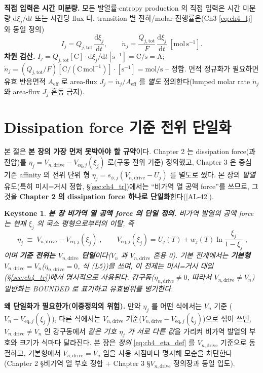 \documentclass[11pt,a4paper]{article}
\newtheorem*{keybox}{Keystone}
\newcommand{\dd}{\mathrm{d}}
\newcommand{\eff}{\mathrm{eff}}
\newcommand{\eq}{\mathrm{eq}}
\newcommand{\drive}{\mathrm{drive}}
\newcommand{\tot}{\mathrm{tot}}
\newcommand{\AL}[1]{\textsf{[AL-#1]}}
\begin{document}
\textbf{직접 입력은 시간 미분량.} 모든 발열률$\cdot$entropy production 의 직접 입력은 시간 미분량 $\dd\xi_j/\dd t$
또는 시간당 flux 다. transition 별 전하/molar 진행률은(Ch3 \eqref{eq:ch4_Ij} 와 동일 정의)
\begin{equation}
I_j=Q_{j,\tot}\,\frac{\dd\xi_j}{\dd t},\qquad
\dot n_j=\frac{Q_{j,\tot}}{F}\,\frac{\dd\xi_j}{\dd t}\ [\mathrm{mol\,s^{-1}}].
\label{eq:ch4_Ij}
\end{equation}
\textbf{차원 검산.} $I_j=Q_{j,\tot}[\mathrm C]\cdot\dd\xi_j/\dd t[\mathrm{s^{-1}}]=\mathrm{C/s}=\mathrm A$;
$\dot n_j=(Q_{j,\tot}/F)[\mathrm{C}/(\mathrm{C\,mol^{-1}})]\cdot[\mathrm{s^{-1}}]=\mathrm{mol/s}$ -- 정합. 면적
정규화가 필요하면 유효 반응면적 $A_{\eff}$ 로 area-flux $J_j=\dot n_j/A_{\eff}$ 를 \emph{별도} 정의한다(lumped
molar rate $\dot n_j$ 와 area-flux $J_j$ 혼동 금지).

\section{Dissipation force 기준 전위 단일화}\label{sec:ch4_eta_single}
본 절은 \textbf{본 장의 가장 먼저 못박아야 할 규약}이다. Chapter 2 는 dissipation force(과전압)를
$\eta_j=V_{n,\drive}-V_{\eq,j}(\xi_j)$ 로(구동 전위 기준) 정의했고, Chapter 3 은 중심 기준 affinity 의
전위 단위 형 $\eta_j=s_{\phi,j}(V_{n,\drive}-U_j)$ 를 별도로 썼다. 본 장의 \emph{발열} 유도(특히 미시=거시
정합, \S\ref{sec:ch4_tr})에서는 ``비가역 열 공액 force''를 쓰므로, 그것을 \textbf{Chapter 2 의 dissipation
force 하나로 단일화}한다(\AL{42}).
\begin{keybox}
\textbf{본 장 비가역 열 공액 force 의 단일 정의.} 비가역 발열의 공액 force 는 \emph{현재}
$\xi_j$ 의 국소 평형으로부터의 이탈, 즉
\begin{equation}
\boxed{\;\eta_j\;\equiv\;V_{n,\drive}-V_{\eq,j}(\xi_j)\;,\qquad V_{\eq,j}(\xi_j)=U_j(T)+w_j(T)\ln\frac{\xi_j}{1-\xi_j}\;,}
\label{eq:ch4_eta_def}
\end{equation}
이며 \textbf{기준 전위는 $V_{n,\drive}$ 단일}이다($V_n$ 과 $V_{n,\drive}$ 혼용 0). 기본 전개에서는
\textbf{기본형 $V_{n,\drive}=V_n$}($\eta_{n,\drive}=0$, 식 (L5))을 쓰며, 이 전제는 미시=거시 대입
(\S\ref{sec:ch4_tr})에서 \emph{명시적으로} 사용된다. 강구동($\eta_{n,\drive}\ne0$, 따라서 $V_{n,\drive}\ne V_n$)
일반화는 BOUNDED 로 표기하고 유효범위를 병기한다.
\end{keybox}
\textbf{왜 단일화가 필요한가(이중정의의 위험).} 만약 $\eta_j$ 를 어떤 식에서는 $V_n$ 기준
($V_n-V_{\eq,j}(\xi_j)$), 다른 식에서는 $V_{n,\drive}$ 기준($V_{n,\drive}-V_{\eq,j}(\xi_j)$)으로 섞어 쓰면,
$V_{n,\drive}\ne V_n$ 인 강구동에서 \emph{같은 기호 $\eta_j$ 가 서로 다른 값}을 가리켜 비가역 발열의 부호와
크기가 식마다 달라진다. 본 장은 \emph{정의}
\eqref{eq:ch4_eta_def} 를 $V_{n,\drive}$ 기준으로 동결하고, 기본형에서 $V_{n,\drive}=V_n$ 임을 사용 시점마다
명시해 모순을 차단한다(Chapter 2 \S 비가역 열 부호 정합 + Chapter 3 \S$V_{n,\drive}$ 정의장과 동일 입도).
\end{document}

